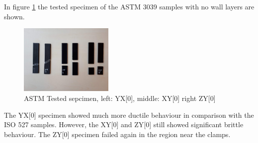 In figure \ref{fig:ASTM3039specimen} the tested specimen of the ASTM 3039 samples with no wall layers are shown.
\begin{figure}[H]
    \centering
    \includegraphics[width=0.40\textwidth]{chapter_5_Experimentaltesting/figures/ImageASTM.jpg}
    \caption{ASTM Tested sepcimen, left: YX[0], middle: XY[0] right ZY[0]}
    \label{fig:ASTM3039specimen}
\end{figure}
The YX[0] specimen showed much more ductile behaviour in comparison with the ISO 527 samples. However, the XY[0] and ZY[0] still showed significant brittle behaviour. The ZY[0] specimen failed again in the region near the clamps.

